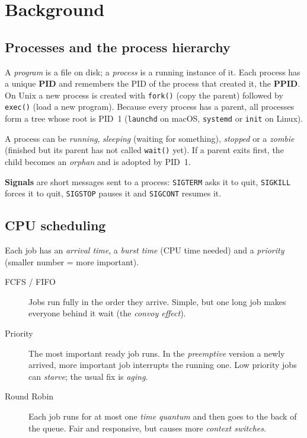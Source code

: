 \documentclass[11pt,a4paper]{article}
\begin{document}
\section{Background}

\subsection{Processes and the process hierarchy}
A \emph{program} is a file on disk; a \emph{process} is a running instance of it. Each
process has a unique \textbf{PID} and remembers the PID of the process that created it,
the \textbf{PPID}. On Unix a new process is created with \texttt{fork()} (copy the parent)
followed by \texttt{exec()} (load a new program). Because every process has a parent, all
processes form a tree whose root is PID~1 (\texttt{launchd} on macOS, \texttt{systemd} or
\texttt{init} on Linux).

A process can be \emph{running}, \emph{sleeping} (waiting for something), \emph{stopped}
or a \emph{zombie} (finished but its parent has not called \texttt{wait()} yet). If a
parent exits first, the child becomes an \emph{orphan} and is adopted by PID~1.

\textbf{Signals} are short messages sent to a process: \texttt{SIGTERM} asks it to quit,
\texttt{SIGKILL} forces it to quit, \texttt{SIGSTOP} pauses it and \texttt{SIGCONT} resumes it.

\subsection{CPU scheduling}
Each job has an \emph{arrival time}, a \emph{burst time} (CPU time needed) and a
\emph{priority} (smaller number = more important).
\begin{description}
  \item[FCFS / FIFO] Jobs run fully in the order they arrive. Simple, but one long job
        makes everyone behind it wait (the \emph{convoy effect}).
  \item[Priority] The most important ready job runs. In the \emph{preemptive} version a newly
        arrived, more important job interrupts the running one. Low priority jobs can
        \emph{starve}; the usual fix is \emph{aging}.
  \item[Round Robin] Each job runs for at most one \emph{time quantum} and then goes to the
        back of the queue. Fair and responsive, but causes more \emph{context switches}.
\end{description}
\end{document}
